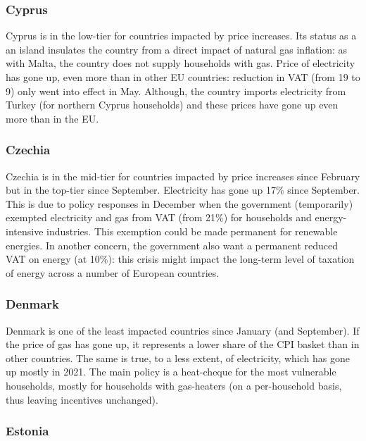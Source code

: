 \documentclass[
  9pt,
  a4paper,
  DIV=11,
  numbers=noendperiod]{scrartcl}
\begin{document}
\hypertarget{cyprus}{%
\subsubsection{Cyprus}\label{cyprus}}

Cyprus is in the low-tier for countries impacted by price increases. Its
status as a an island insulates the country from a direct impact of
natural gas inflation: as with Malta, the country does not supply
households with gas. Price of electricity has gone up, even more than in
other EU countries: reduction in VAT (from 19 to 9) only went into
effect in May. Although, the country imports electricity from Turkey
(for northern Cyprus households) and these prices have gone up even more
than in the EU.

\hypertarget{czechia}{%
\subsubsection{Czechia}\label{czechia}}

Czechia is in the mid-tier for countries impacted by price increases
since February but in the top-tier since September. Electricity has gone
up 17\% since September. This is due to policy responses in December
when the government (temporarily) exempted electricity and gas from VAT
(from 21\%) for households and energy-intensive industries. This
exemption could be made permanent for renewable energies. In another
concern, the government also want a permanent reduced VAT on energy (at
10\%): this crisis might impact the long-term level of taxation of
energy across a number of European countries.

\hypertarget{denmark}{%
\subsubsection{Denmark}\label{denmark}}

Denmark is one of the least impacted countries since January (and
September). If the price of gas has gone up, it represents a lower share
of the CPI basket than in other countries. The same is true, to a less
extent, of electricity, which has gone up mostly in 2021. The main
policy is a heat-cheque for the most vulnerable households, mostly for
households with gas-heaters (on a per-household basis, thus leaving
incentives unchanged).

\hypertarget{estonia}{%
\subsubsection{Estonia}\label{estonia}}
\end{document}
